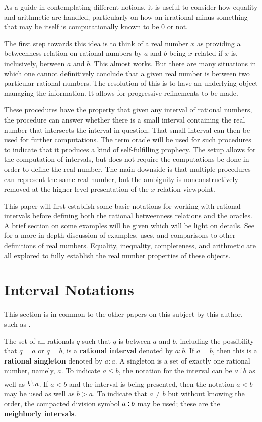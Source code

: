 \documentclass[12pt]{article}
\begin{document}
As a guide in contemplating different notions, it is useful to consider how equality and arithmetic are handled, particularly on how an irrational minus something that may be itself is computationally known to be 0 or not. 

The first step towards this idea is to think of a real number $x$ as providing a betweenness relation on rational numbers by $a$ and $b$ being $x$-related if $x$ is, inclusively, between $a$ and $b$. This almost works. But there are many situations in which one cannot definitively conclude that a given real number is between two particular rational numbers. The resolution of this is to have an underlying object managing the information. It allows for progressive refinements to be made. 

These procedures have the property that given any interval of rational numbers, the procedure can answer whether there is a small interval containing the real number that intersects the interval in question. That small interval can then be used for further computations. The term oracle will be used for such procedures to indicate that it produces a kind of self-fulfilling prophecy. The setup allows for the computation of intervals, but does not require the computations be done in order to define the real number. The main downside is that multiple procedures can represent the same real number, but the ambiguity is nonconstructively removed at the higher level presentation of the $x$-relation viewpoint.  

This paper will first establish some basic notations for working with rational intervals before defining both the rational betweenness relations and the oracles. A brief section on some examples will be given which will be light on details. See \cite{taylor23main} for a more in-depth discussion of examples, uses, and comparisons to other definitions of real numbers. Equality, inequality, completeness, and arithmetic are all explored to fully establish the real number properties of these objects. 

\section{Interval Notations}

This section is in common to the other papers on this subject by this author, such as \cite{taylor24dedekind}.

The set of all rationals $q$ such that $q$ is between $a$ and $b$, including the possibility that $q=a$ or $q=b$, is a \textbf{rational interval} denoted by $a:b$. If $a=b$, then this is a \textbf{rational singleton} denoted by $a:a$. A singleton is a set of exactly one rational number, namely, $a$. To indicate $a \leq b$, the notation for the interval can be $a \lte b$ as well as $b \gte a$. If $a < b$ and the interval is being presented, then the notation $a \lt b$ may be used as well as $b \gt a$. To indicate that $a \neq b$ but without knowing the order, the compacted division symbol $a \mathord{\div} b$ may be used; these are the \textbf{neighborly intervals}. 
\end{document}
